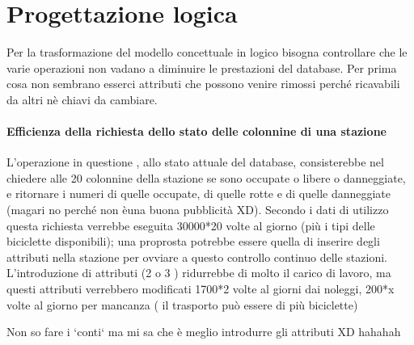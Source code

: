 \documentclass[a4paper,twoside]{article}
\begin{document}
\section{Progettazione logica}
Per la trasformazione del modello concettuale in logico bisogna controllare che le varie operazioni non vadano a diminuire le prestazioni del database.\newline
Per prima cosa non sembrano esserci attributi che possono venire rimossi perché ricavabili da altri nè chiavi da cambiare.

\paragraph{Efficienza della richiesta dello stato delle colonnine di una stazione}
L'operazione in questione , allo stato attuale del database, consisterebbe nel chiedere alle 20 colonnine della stazione se sono occupate o libere o danneggiate, e ritornare i numeri di quelle occupate, di quelle rotte e di quelle danneggiate (magari no perché non èuna buona pubblicità XD).\newline
Secondo i dati di utilizzo questa richiesta verrebbe eseguita 30000*20 volte al giorno (più i tipi delle biciclette disponibili); una proprosta potrebbe essere quella di inserire degli attributi nella stazione per ovviare a questo controllo continuo delle stazioni.\newline
L'introduzione di attributi (2 o 3 ) ridurrebbe di molto il carico di lavoro, ma questi attributi verrebbero modificati 1700*2 volte al giorni dai noleggi, 200*x volte al giorno per mancanza ( il trasporto può essere di più biciclette)

Non so fare i `conti` ma mi sa che è meglio introdurre gli attributi XD hahahah
\end{document}
